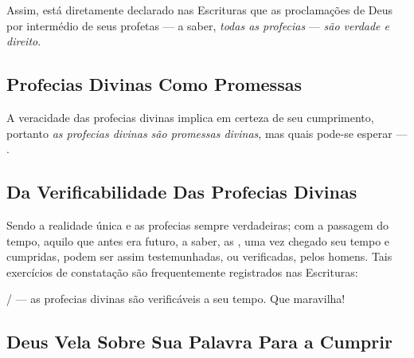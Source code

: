     Assim, está diretamente declarado nas Escrituras que as proclamações de Deus por intermédio de seus profetas  ---  a  saber,
    \emph{todas as profecias} --- \emph{são verdade e direito}.

    \subsection{Profecias Divinas Como Promessas}

        
    A veracidade das profecias divinas implica em certeza de seu cumprimento, portanto \emph{as profecias divinas são  promessas
    divinas}, mas quais pode-se esperar --- .

    \subsection{Da Verificabilidade Das Profecias Divinas}

    Sendo a realidade única e as profecias sempre verdadeiras; com a passagem do tempo, aquilo que antes era futuro, a saber, as
    ,  uma  vez  chegado  seu  tempo  e  cumpridas,  podem  ser  assim
    testemunhadas, ou verificadas, pelos homens. Tais exercícios de constatação são frequentemente registrados nas Escrituras:

 
     /  --- as profecias divinas são  verificáveis  a  seu  tempo.  Que
    maravilha!

    \subsection{Deus Vela Sobre Sua Palavra Para a Cumprir}

